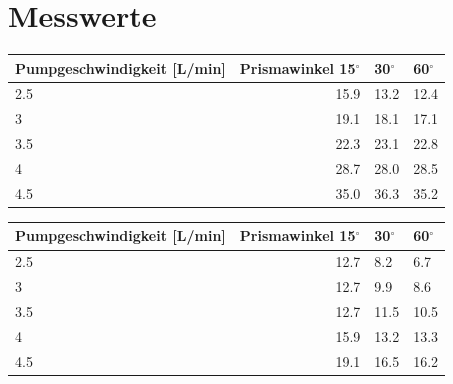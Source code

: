 \documentclass[titlepage=firstcover, captions=tableheading]{scrartcl}
\begin{document}
\section{Messwerte}

\begin{minipage}{\linewidth}
    \begin{table}[H]
        \centering
    
    \begin{tabular}{lrll}
        \toprule
        Pumpgeschwindigkeit [L/min] & Prismawinkel 15$^{\circ}$ & 30$^{\circ}$ & 60$^{\circ}$ \\
        \midrule
        2.5   &  15.9 &   13.2  &  12.4 \\ 
        3     &  19.1 &   18.1  &  17.1 \\ 
        3.5   &  22.3 &   23.1  &  22.8 \\ 
        4     &  28.7 &   28.0  &  28.5 \\ 
        4.5   &  35.0 &   36.3  &  35.2 \\    
        \bottomrule
        
    \end{tabular}
    \label{tab:1}
    \end{table}
    \end{minipage}

    \begin{minipage}{\linewidth}
        \begin{table}[H]
            \centering
        
        \begin{tabular}{lrll}
            \toprule
            Pumpgeschwindigkeit [L/min] & Prismawinkel 15$^{\circ}$ & 30$^{\circ}$ & 60$^{\circ}$ \\
            \midrule
            2.5   &  12.7  &  8.2   &  6.7   \\ 
            3     &  12.7  &  9.9   &  8.6   \\ 
            3.5   &  12.7  &  11.5  &  10.5  \\ 
            4     &  15.9  &  13.2  &  13.3  \\ 
            4.5   &  19.1  &  16.5  &  16.2  \\    
            \bottomrule
            
        \end{tabular}
        \label{tab:2}
        \end{table}
        \end{minipage}
\end{document}
